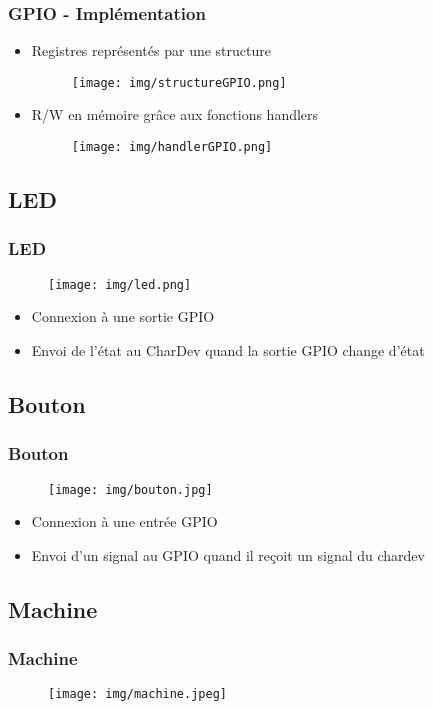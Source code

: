 \documentclass{beamer}
\begin{document}
			\begin{frame}
				\frametitle{GPIO - Implémentation}
				\begin{itemize}
					\item Registres représentés par une structure
						\begin{figure}
							\texttt{[image: img/structureGPIO.png]}
						\end{figure}
					\item R/W en mémoire grâce aux fonctions handlers
						\begin{figure}
							\texttt{[image: img/handlerGPIO.png]}
						\end{figure}
				\end{itemize}
			\end{frame}
		
		
		\subsection{LED}
			\begin{frame}
				\frametitle{LED}
				\begin{figure}
					\texttt{[image: img/led.png]}
				\end{figure}
				\begin{itemize}
					\item Connexion à une sortie GPIO
					\item Envoi de l'état au CharDev quand la sortie GPIO change d'état
				\end{itemize}
			\end{frame}
		
		\subsection{Bouton}
			\begin{frame}
				\frametitle{Bouton}
				\begin{figure}
					\texttt{[image: img/bouton.jpg]}
				\end{figure}
				\begin{itemize}
					\item Connexion à une entrée GPIO
					\item Envoi d'un signal au GPIO quand il reçoit un signal du chardev
				\end{itemize}
			\end{frame}
			
		\subsection{Machine}
			\begin{frame}
				\frametitle{Machine}
				\begin{figure}
					\texttt{[image: img/machine.jpeg]}
				\end{figure}
			\end{frame}
		
\end{document}
